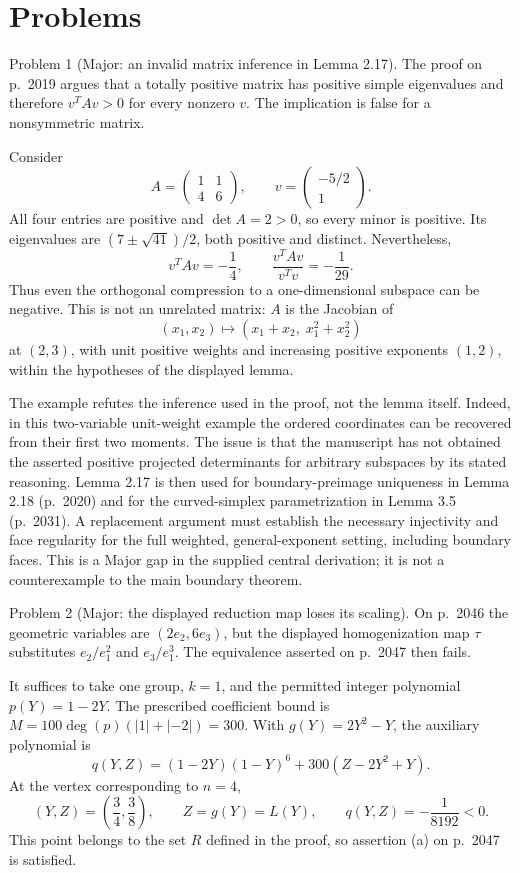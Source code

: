 \documentclass[10pt]{article}
\begin{document}
\section*{Problems}
Problem 1 (Major: an invalid matrix inference in Lemma 2.17).  The proof on p. 2019 argues that a totally positive matrix has positive simple eigenvalues and therefore \(v^TAv>0\) for every nonzero \(v\). The implication is false for a nonsymmetric matrix.\par
Consider \[A=\begin{pmatrix}1&1\\4&6\end{pmatrix},
 \qquad v=\begin{pmatrix}-5/2\\1\end{pmatrix}.\] All four entries are positive and \(\det A=2>0\), so every minor is positive. Its eigenvalues are \((7\pm\sqrt{41})/2\), both positive and distinct. Nevertheless, \[v^TAv=-\frac14,\qquad
 \frac{v^TAv}{v^Tv}=-\frac1{29}.\] Thus even the orthogonal compression to a one-dimensional subspace can be negative. This is not an unrelated matrix: \(A\) is the Jacobian of \[(x_1,x_2)\longmapsto(x_1+x_2,\;x_1^2+x_2^2)\] at \((2,3)\), with unit positive weights and increasing positive exponents \((1,2)\), within the hypotheses of the displayed lemma.\par
The example refutes the inference used in the proof, not the lemma itself. Indeed, in this two-variable unit-weight example the ordered coordinates can be recovered from their first two moments. The issue is that the manuscript has not obtained the asserted positive projected determinants for arbitrary subspaces by its stated reasoning. Lemma 2.17 is then used for boundary-preimage uniqueness in Lemma 2.18 (p. 2020) and for the curved-simplex parametrization in Lemma 3.5 (p. 2031). A replacement argument must establish the necessary injectivity and face regularity for the full weighted, general-exponent setting, including boundary faces. This is a Major gap in the supplied central derivation; it is not a counterexample to the main boundary theorem.\par
Problem 2 (Major: the displayed reduction map loses its scaling).  On p. 2046 the geometric variables are \((2e_2,6e_3)\), but the displayed homogenization map \(\tau\) substitutes \(e_2/e_1^2\) and \(e_3/e_1^3\). The equivalence asserted on p. 2047 then fails.\par
It suffices to take one group, \(k=1\), and the permitted integer polynomial \(p(Y)=1-2Y\). The prescribed coefficient bound is \(M=100\deg(p)(|1|+|-2|)=300\). With \(g(Y)=2Y^2-Y\), the auxiliary polynomial is \[q(Y,Z)=(1-2Y)(1-Y)^6+300(Z-2Y^2+Y).\] At the vertex corresponding to \(n=4\), \[(Y,Z)=\left(\frac34,\frac38\right),\qquad
 Z=g(Y)=L(Y),\qquad
 q(Y,Z)=-\frac1{8192}<0.\] This point belongs to the set \(R\) defined in the proof, so assertion (a) on p. 2047 is satisfied.\par
\end{document}
